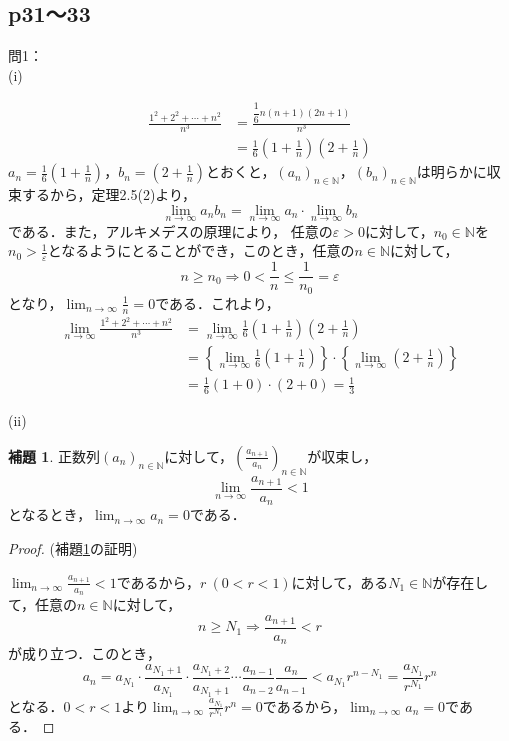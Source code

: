 \documentclass[dvipdfmx,uplatex,11pt]{jsarticle}
\theoremstyle{definition}
\newtheorem{lemm}{補題}[section]
\begin{document}
\subsection{p31〜33}
問1：\\
(i)
\begin{leftbar}
	\begin{align*}
		\frac{1^2+2^2+\cdots+n^2}{n^3} & = \frac{\dfrac{1}{6}n(n+1)(2n+1)}{n^3} \\
		& =\frac{1}{6} \left(1+\frac{1}{n} \right ) \left(2+\frac{1}{n} \right)
	\end{align*}
	$a_n = \frac{1}{6} \left(1+\frac{1}{n} \right )$，$b_n = \left(2+\frac{1}{n} \right)$とおくと，$(a_n)_{n \in \mathbb{N}}$，$(b_n)_{n \in \mathbb{N}}$は明らかに収束するから，定理2.5(2)より，
	\[
		\lim_{n \to \infty} a_n b_n = \lim_{n \to \infty} a_n \cdot  \lim_{n \to \infty} b_n 
	\]
	である．また，アルキメデスの原理により， 任意の$\varepsilon >0$に対して，$n_0 \in \mathbb{N}$を$n_0 >\frac{1}{\varepsilon}$となるようにとることができ，このとき，任意の$n \in \mathbb{N}$に対して，
	\[
		n \ge n_0 \Longrightarrow 0<\frac{1}{n} \le \frac{1}{n_0} = \varepsilon
	\]
	となり，$\lim_{n \to \infty} \frac{1}{n} =0$である．これより，
	\begin{align*}
		\lim_{n \to \infty} \frac{1^2+2^2+\cdots+n^2}{n^3} & = \lim_{n \to \infty} \frac{1}{6} \left(1+\frac{1}{n} \right ) \left(2+\frac{1}{n} \right) \\
		& = \left \{\lim_{n \to \infty} \frac{1}{6} \left(1+\frac{1}{n} \right ) \right \} \cdot \left \{\lim_{n \to \infty} \left(2+\frac{1}{n} \right ) \right \} \\
		& = \frac{1}{6} (1+0) \cdot (2+0) =\frac{1}{3}
	\end{align*}
\end{leftbar}
\newpage
(ii)
\begin{lemm}
    \label{p31:問1.2}
    正数列$(a_n)_{n \in \mathbb{N}}$に対して，$\left(\frac{a_{n+1}}{a_n} \right)_{n \in \mathbb{N}}$が収束し，
    \[
    \lim_{n \to \infty} \frac{a_{n+1}}{a_n} <1
    \]
    となるとき，$\lim_{n \to \infty} a_n =0$である．
\end{lemm}
%
\begin{proof}(補題\ref{p31:問1.2}の証明)\par 
   $ \lim_{n \to \infty} \frac{a_{n+1}}{a_n} <1$であるから，$r~(0<r<1)$に対して，ある$N_1 \in \mathbb{N}$が存在して，任意の$n \in \mathbb{N}$に対して，
   \[
       n \ge N_1 \Longrightarrow \frac{a_{n+1}}{a_n}<r
   \]
   が成り立つ．このとき，
   \[
       a_n = a_{N_1} \cdot \frac{a_{N_1+1}}{a_{N_1}} \cdot \frac{a_{N_1 +2}}{a_{N_1 +1}} \cdots \frac{a_{n-1}}{a_{n-2}} \frac{a_n}{a_{n-1}}< a_{N_1} r^{n-N_1}=\frac{a_{N_1}}{r^{N_1}} r^n
   \]
   となる．$0<r<1$より$\lim_{n \to \infty} \frac{a_{N_1}}{r^{N_1}} r^n =0$であるから，$\lim_{n \to \infty} a_n =0$である．
\end{proof}
\end{document}
